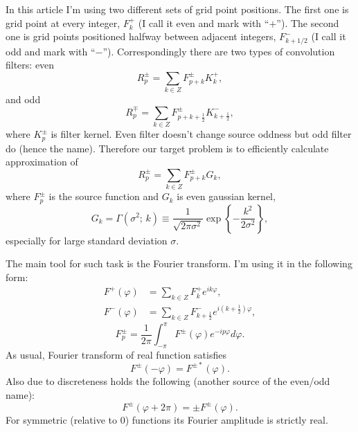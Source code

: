 \documentclass[10pt]{article}
\begin{document}
In this article I'm using two different sets of grid point positions. The first one is grid point at
every integer, $F^+_k$ (I call it even and mark with ``$+$''). The second one is grid points positioned
halfway between adjacent integers, $F^-_{k+1/2}$ (I call it odd and mark with ``$-$'').
Correspondingly there are two types of convolution filters: even
\begin{equation}\label{conv+}
    R^\pm_p = \sum_{k\in Z} F^\pm_{p+k}K^+_k,
\end{equation}
and odd
\begin{equation}\label{conv-}
    R^\mp_p = \sum_{k\in Z} F^\pm_{p+k+\frac12}K^-_{k+\frac12},
\end{equation}
where $K^\pm_p$ is filter kernel. Even filter doesn't change source oddness but odd filter do (hence
the name). Therefore our target problem is to efficiently calculate approximation of
\begin{equation}
    R^\pm_p = \sum_{k\in Z} F^\pm_{p+k}G_k,
\end{equation}
where $F^\pm_p$ is the source function and $G_k$ is even gaussian kernel,
\begin{equation}\label{gamma}
    G_k = \Gamma(\sigma^2;\, k) \equiv
        \frac1{\sqrt{2\pi\sigma^2}}\exp\left\{-\frac{k^2}{2\sigma^2}\right\},
\end{equation}
especially for large standard deviation $\sigma$.

The main tool for such task is the Fourier transform. I'm using it in the following form:
\begin{align}
    F^+(\varphi) &= \sum_{k\in Z} F^+_k e^{ik\varphi},\\
    F^-(\varphi) &= \sum_{k\in Z} F^-_{k+\frac12} e^{i(k+\frac12)\varphi},
\end{align}
\begin{equation}
    F^\pm_p = \frac1{2\pi}\int_{-\pi}^\pi F^\pm(\varphi)e^{-ip\varphi}d\varphi.
\end{equation}
As usual, Fourier transform of real function satisfies
\begin{equation}
    F^\pm(-\varphi) = F^{\pm*}(\varphi).
\end{equation}
Also due to discreteness holds the following (another source of the even/odd name):
\begin{equation}
    F^\pm(\varphi+2\pi) = \pm F^\pm(\varphi).
\end{equation}
For symmetric (relative to 0) functions its Fourier amplitude is strictly real.
\end{document}
